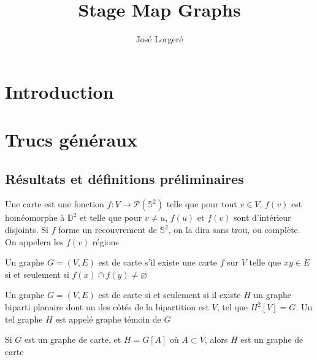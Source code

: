 \documentclass{scrartcl}
\begin{document}
\title{Stage Map Graphs}

\author{José Lorgeré}

\maketitle

\begin{flushleft}

\section*{Introduction}

\section{Trucs généraux}

\subsection{Résultats et définitions préliminaires}

\begin{def*}[Carte]
    Une carte est une fonction $f : V \rightarrow \mathcal{P}(\mathbb{S}^2)$ telle que pour tout $v \in V$, $f(v)$
    est homéomorphe à $\mathbb{D}^2$ et telle que pour $v \neq u$, $f(u)$ et $f(v)$ sont d'intérieur disjoints. Si
    $f$ forme un recouvrement de $\mathbb{S}^2$, on la dira sans trou, ou complète. On appelera les $f(v)$ régions
\end{def*}

\begin{def*}
    Un graphe $G = (V, E)$ est de carte s'il existe une carte $f$ sur $V$ telle que $xy \in E$ si et seulement si
    $f(x) \cap f(y) \neq \varnothing$
\end{def*}

\begin{theorem}\label{carCarte}
    Un graphe $G = (V, E)$ est de carte si et seulement si il existe $H$ un graphe biparti planaire dont un des
    côtés de la bipartition est $V$, tel que $H^2[V] = G$. Un tel graphe $H$ est appelé graphe témoin de $G$
\end{theorem}

\begin{prop}
    Si $G$ est un graphe de carte, et $H = G[A]$ où $A \subset V$, alors $H$ est un graphe de carte
\end{prop}


\end{flushleft}
\end{document}
